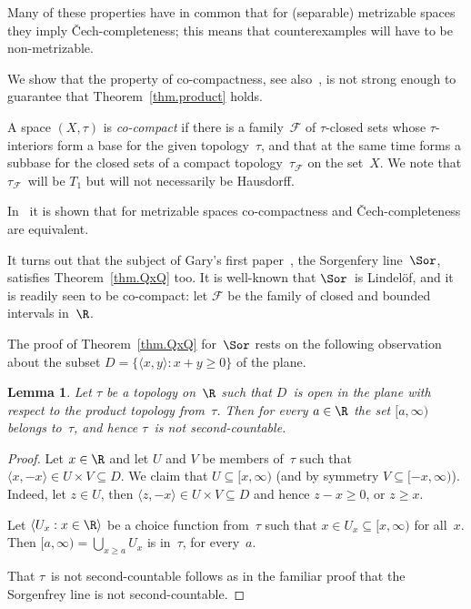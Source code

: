 \documentclass[a4paper]{amsart}
\newcommand\calF{\mathcal{F}}
\newcommand\orpr[2]{\langle{#1},{#2}\rangle}
\theoremstyle{plain}
\newtheorem{lemma}[theorem]{Lemma}
\theoremstyle{definition}
\theoremstyle{remark}
\begin{document}
Many of these properties have in common that for (separable) metrizable spaces
they imply \v{C}ech-completeness; this means that counterexamples will
have to be non-metrizable.

\smallbreak
We show that the property of co-compactness, see also~\cite{MR0261539},
is not strong enough to guarantee that Theorem~\ref{thm.product} holds.

A space $(X,\tau)$ is \emph{co-compact} if there is a family~$\calF$ 
of $\tau$-closed sets whose $\tau$-interiors form a base for the 
given topology~$\tau$, and that at the same time forms a subbase for the
closed sets of a compact topology~$\tau_\calF$ on the set~$X$.
We note that $\tau_\calF$~will be $T_1$ but will not necessarily be Hausdorff.

In~\cite{MR0261539} it is shown that for metrizable spaces co-compactness
and \v{C}ech-com\-plete\-ness are equivalent.

\smallbreak
It turns out that the subject of Gary's first paper~\cite{MR0317286}, the
Sorgenfery line~$\Sor$, satisfies Theorem~\ref{thm.QxQ} too.
It is well-known that $\Sor$~is Lindel\"of, and it is readily seen to
be co-compact: let $\calF$ be the family of closed and bounded 
intervals in~$\R$.

The proof of Theorem~\ref{thm.QxQ} for~$\Sor$ rests on the following 
observation about the subset $D=\{\orpr xy:x+y\ge0\}$ of the plane.

\begin{lemma}
Let $\tau$ be a topology on~$\R$ such that $D$~is open in the plane with
respect to the product topology from~$\tau$.
Then for every $a\in\R$ the set $[a,\infty)$ belongs to~$\tau$, and
hence $\tau$~is not second-countable.  
\end{lemma}

\begin{proof}
Let $x\in\R$ and let $U$ and $V$ be members of~$\tau$ such that 
$\orpr x{-x}\in U\times V\subseteq D$.
We claim that $U\subseteq[x,\infty)$ (and by symmetry $V\subseteq[-x,\infty)$).
Indeed, let $z\in U$, then $\orpr z{-x}\in U\times V\subseteq D$
and hence $z-x\ge0$, or $z\ge x$.

Let $\langle U_x:x\in\R\rangle$ be a choice function from~$\tau$ such that
$x\in U_x\subseteq[x,\infty)$ for all~$x$.
Then $[a,\infty)=\bigcup_{x\ge a}U_x$ is in~$\tau$, for every~$a$.  

That $\tau$~is not second-countable follows as in the familiar proof that
the Sorgenfrey line is not second-countable.
\end{proof}
\end{document}
